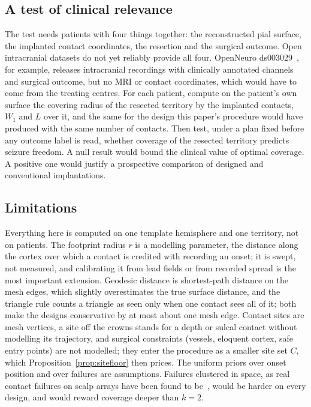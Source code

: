\documentclass[11pt]{amsart}
\theoremstyle{definition}
\theoremstyle{remark}
\begin{document}
\subsection*{A test of clinical relevance}
The test needs patients with four things together: the reconstructed pial
surface, the implanted contact coordinates, the resection and the surgical
outcome. Open intracranial datasets do not yet reliably provide all four.
OpenNeuro ds003029~\cite{Li2021}, for example, releases intracranial
recordings with clinically annotated channels and surgical outcome, but no MRI
or contact coordinates, which would have to come from the treating centres.
For each patient, compute on the patient's own surface the covering radius of
the resected territory by the implanted contacts, $W_1$ and $L$ over it, and
the same for the design this paper's procedure would have produced with the
same number of contacts. Then test, under a plan fixed before any outcome label
is read, whether coverage of the resected territory predicts seizure freedom.
A null result would bound the clinical value of optimal coverage. A positive
one would justify a prospective comparison of designed and conventional
implantations.

\subsection*{Limitations}
Everything here is computed on one template hemisphere and one territory, not
on patients. The footprint radius $r$ is a modelling parameter, the distance
along the cortex over which a contact is credited with recording an onset; it
is swept, not measured, and calibrating it from lead fields or from recorded
spread is the most important extension. Geodesic distance is shortest-path
distance on the mesh edges, which slightly overestimates the true surface
distance, and the triangle rule counts a triangle as seen only when one
contact sees all of it; both make the designs conservative by at most about
one mesh edge. Contact sites are mesh vertices, a site off the crowns stands
for a depth or sulcal contact without modelling its trajectory, and surgical
constraints (vessels, eloquent cortex, safe entry points) are not modelled;
they enter the procedure as a smaller site set $C$, which
Proposition~\ref{prop:sitefloor} then prices. The uniform priors over onset
position and over failures are assumptions. Failures clustered in space, as
real contact failures on scalp arrays have been found to be~\cite{kshadowcode},
would be harder on every design, and would reward coverage deeper than $k=2$.
\end{document}
